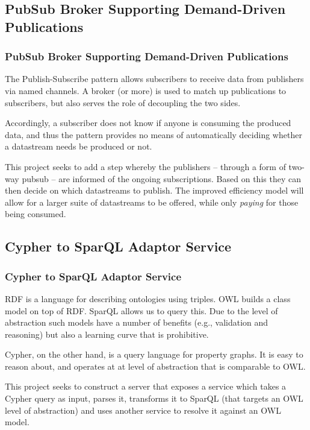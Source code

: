 \subsection{PubSub Broker Supporting Demand-Driven Publications}
\begin{frame}
  \frametitle{PubSub Broker Supporting Demand-Driven Publications}
  \vspace{3mm}
  The Publish-Subscribe pattern allows subscribers to receive data from publishers via named channels. A broker (or more) is used to match up publications to subscribers, but also serves the role of decoupling the two sides.
  
  \vspace{5mm}
  Accordingly, a subscriber does not know if anyone is consuming the produced data, and thus the pattern provides no means of automatically deciding whether a datastream needs be produced or not.
  
  \vspace{5mm}
  This project seeks to add a step whereby the publishers -- through a form of two-way pubsub -- are informed of the ongoing subscriptions. Based on this they can then decide on which datastreams to publish. The improved efficiency model will allow for a larger suite of datastreams to be offered, while only \textsl{paying} for those being consumed.

\end{frame}

\subsection{Cypher to SparQL Adaptor Service}
\begin{frame}
  \frametitle{Cypher to SparQL Adaptor Service}
  \vspace{3mm}
  RDF is a language for describing ontologies using triples. OWL builds a class model on top of RDF. SparQL allows us to query this. Due to the level of abstraction such models have a number of benefits (e.g., validation and reasoning) but also a learning curve that is prohibitive.
  
  \vspace{5mm}
  Cypher, on the other hand, is a query language for property graphs. It is easy to reason about, and operates at at level of abstraction that is comparable to OWL.
  
  \vspace{5mm}
  This project seeks to construct a server that exposes a service which takes a Cypher query as input, parses it, transforms it to SparQL (that targets an OWL level of abstraction) and uses another service to resolve it against an OWL model.
\end{frame}

